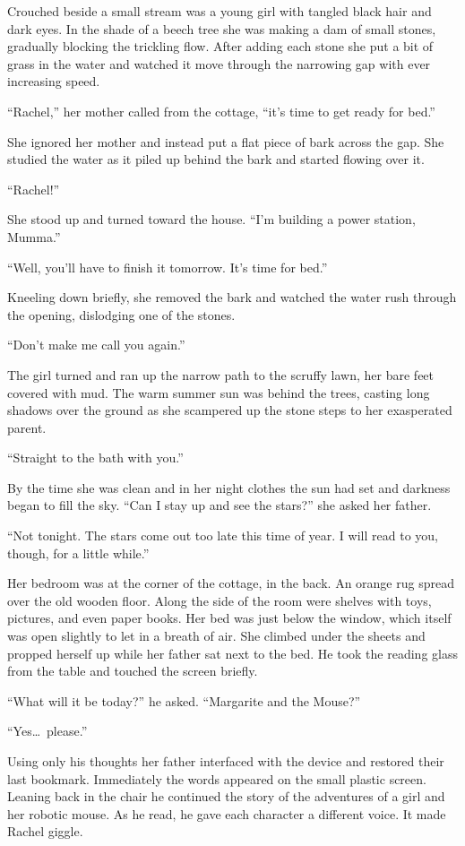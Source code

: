 
Crouched beside a small stream was a young girl with tangled black hair and dark eyes. In the
shade of a beech tree she was making a dam of small stones, gradually blocking the trickling
flow. After adding each stone she put a bit of grass in the water and watched it move through
the narrowing gap with ever increasing speed.

``Rachel,'' her mother called from the cottage, ``it's time to get ready for bed.''

She ignored her mother and instead put a flat piece of bark across the gap. She studied the
water as it piled up behind the bark and started flowing over it.

``Rachel!''

She stood up and turned toward the house. ``I'm building a power station, Mumma.''

``Well, you'll have to finish it tomorrow. It's time for bed.''

Kneeling down briefly, she removed the bark and watched the water rush through the opening,
dislodging one of the stones.

``Don't make me call you again.''

The girl turned and ran up the narrow path to the scruffy lawn, her bare feet covered with mud.
The warm summer sun was behind the trees, casting long shadows over the ground as she scampered
up the stone steps to her exasperated parent.

``Straight to the bath with you.''

By the time she was clean and in her night clothes the sun had set and darkness began to fill
the sky. ``Can I stay up and see the stars?'' she asked her father.

``Not tonight. The stars come out too late this time of year. I will read to you, though, for a
little while.''

Her bedroom was at the corner of the cottage, in the back. An orange rug spread over the old
wooden floor. Along the side of the room were shelves with toys, pictures, and even paper books.
Her bed was just below the window, which itself was open slightly to let in a breath of air. She
climbed under the sheets and propped herself up while her father sat next to the bed. He took
the reading glass from the table and touched the screen briefly.

``What will it be today?'' he asked. ``Margarite and the Mouse?''

``Yes\ldots\ please.''

Using only his thoughts her father interfaced with the device and restored their last bookmark.
Immediately the words appeared on the small plastic screen. Leaning back in the chair he
continued the story of the adventures of a girl and her robotic mouse. As he read, he gave each
character a different voice. It made Rachel giggle.

